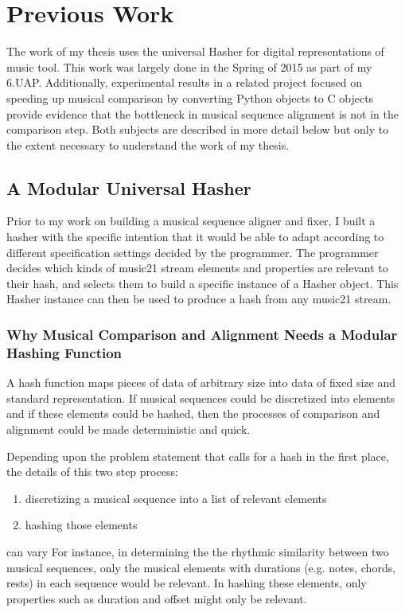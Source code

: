 \chapter{Previous Work}

The work of my thesis uses the universal Hasher for digital representations of music tool. This work was largely done in the Spring of 2015 as part of my 6.UAP. Additionally, experimental results in a related project focused on speeding up musical comparison by converting Python objects to C objects provide evidence that the bottleneck in musical sequence alignment is not in the comparison step. Both subjects are described in more detail below but only to the extent necessary to understand the work of my thesis.

\section{A Modular Universal Hasher}
Prior to my work on building a musical sequence aligner and fixer, I built a hasher with the specific intention that it would be able to adapt according to different specification settings decided by the programmer. The programmer decides which kinds of music21 stream elements and properties are relevant to their hash, and selects them to build a specific instance of a Hasher object. This Hasher instance can then be used to produce a hash from any music21 stream. 

\subsection{Why Musical Comparison and Alignment Needs a Modular Hashing Function}
A hash function maps pieces of data of arbitrary size into data of fixed size and standard representation. If musical sequences could be discretized into elements and if these elements could be hashed, then the processes of comparison and alignment could be made deterministic and quick. 

Depending upon the problem statement that calls for a hash in the first place, the details of this two step process:
\begin{enumerate}
\item discretizing a musical sequence into a list of relevant elements
\item hashing those elements  
\end{enumerate}
can vary For instance, in determining the the rhythmic similarity between two musical sequences, only the musical elements with durations (e.g. notes, chords, rests) in each sequence would be relevant. In hashing these elements, only properties such as duration and offset might only be relevant. 

